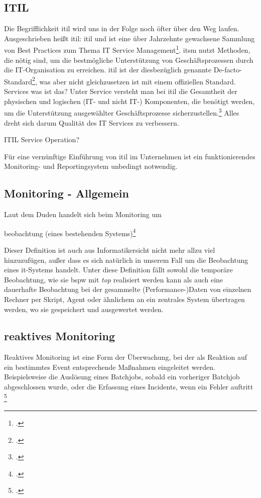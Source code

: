 \documentclass[12pt,a4paper,parskip,listof=totoc,bibliography=totoc]{scrreprt}
\begin{document}
	\subsection{ITIL}
	Die Begrifflichkeit \acrshort{itil} wird uns in der Folge noch öfter über den Weg laufen. Ausgeschrieben heißt \acrshort{itil}: \acrlong{itil} und ist eine über Jahrzehnte gewachsene Sammlung von Best Practices zum Thema IT Service Management\footcite{ebelitilv3}. \glqq\acrfull{itsm} nutzt Methoden, die nötig sind, um die bestmögliche Unterstützung von Geschäftsprozessen durch die IT-Organisation zu erreichen. \acrshort{itil} ist der diesbezüglich genannte De-facto-Standard\grqq\footcite[S. 27]{ebelitilv3}, was aber nicht gleichzusetzen ist mit einem offiziellen Standard. 
	Services was ist das? Unter Service versteht man bei \acrshort{itil} die Gesamtheit der physischen und logischen (IT- und nicht IT-) Komponenten, die benötigt werden, um die Unterstützung ausgewählter Geschäftsprozesse sicherzustellen.\footcite{sommeritservicemgmt}
	Alles dreht sich darum Qualität des IT Services zu verbessern.
	
	ITIL Service Operation? 
	
	Für eine vernünftige Einführung von \acrshort{itil} im Unternehmen ist ein funktionierendes Monitoring- und Reportingsystem unbedingt notwendig.
	\subsection{Monitoring - Allgemein}
	Laut dem Duden handelt sich beim Monitoring um
	\begin{center}
		\glqq[Dauer]beobachtung (eines bestehenden Systems)\grqq\footcite[S. 701; Stichwort Monitoring]{duden}
	\end{center}
	Dieser Definition ist auch aus Informatikersicht nicht mehr allzu viel hinzuzufügen, außer dass es sich natürlich in unserem Fall um die Beobachtung eines \acrshort{it}-Systems handelt. Unter diese Definition fällt sowohl die temporäre Beobachtung, wie sie \acrlong{bspw} mit \textit{top} realisiert werden kann als auch eine dauerhafte Beobachtung bei der gesammelte (Performance-)Daten von einzelnen Rechner per Skript, Agent oder ähnlichem an ein zentrales System übertragen werden, wo sie gespeichert und ausgewertet werden.
	
	\subsection{reaktives Monitoring}
	\glqq Reaktives Monitoring ist eine Form der Überwachung, bei der als Reaktion auf ein bestimmtes Event entsprechende Maßnahmen eingeleitet werden. Beispielsweise die Auslösung eines Batchjobs, sobald ein vorheriger Batchjob abgeschlossen wurde, oder die Erfassung eines Incidents, wenn ein Fehler auftritt\grqq
	\footcite[S. 511]{ebelitilv3}
	
\end{document}
